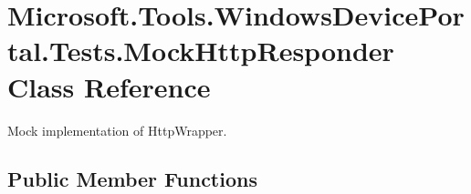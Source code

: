 \hypertarget{class_microsoft_1_1_tools_1_1_windows_device_portal_1_1_tests_1_1_mock_http_responder}{}\section{Microsoft.\+Tools.\+Windows\+Device\+Portal.\+Tests.\+Mock\+Http\+Responder Class Reference}
\label{class_microsoft_1_1_tools_1_1_windows_device_portal_1_1_tests_1_1_mock_http_responder}


Mock implementation of Http\+Wrapper.  


\subsection*{Public Member Functions}
